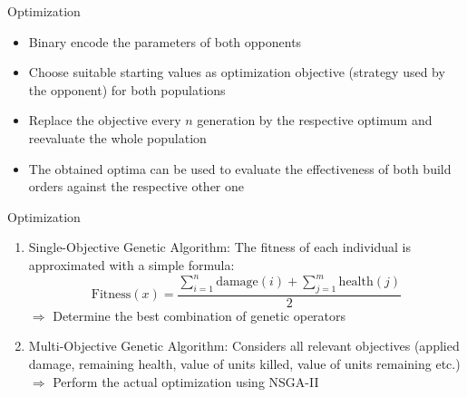 \documentclass{beamer}
\begin{document}
\begin{frame}{Optimization}
\begin{itemize}
\item Binary encode the parameters of both opponents
\item Choose suitable starting values as optimization objective (strategy used by the opponent) for both populations
\item Replace the objective every $n$ generation by the respective optimum and reevaluate the whole population
\item The obtained optima can be used to evaluate the effectiveness of both build orders against the respective other one
\end{itemize}
\end{frame}

\begin{frame}{Optimization}
\begin{enumerate}
\item \alert{Single-Objective Genetic Algorithm:}
The fitness of each individual is approximated with a simple formula: 
\begin{equation*}
		\text{Fitness}(x) =  \frac{\sum\limits_{i=1}^{n} \text{damage}(i) + \sum\limits_{j=1}^{m} \text{health}(j)}{2}
\end{equation*}
$\Rightarrow$ Determine the best combination of genetic operators
\item \alert{Multi-Objective Genetic Algorithm:} Considers all relevant objectives (applied damage, remaining health, value of units killed, value of units remaining etc.)
\\ $\Rightarrow$ Perform the actual optimization using NSGA-II
\end{enumerate}

\end{frame}




\end{document}

